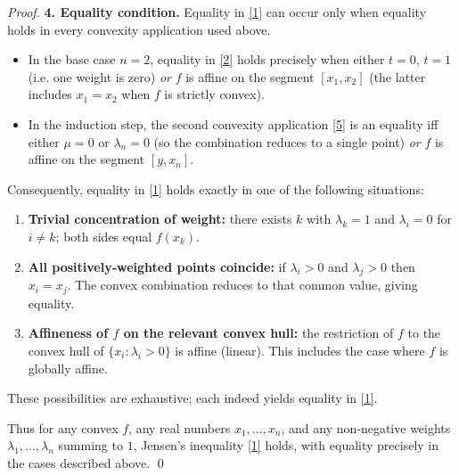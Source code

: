\begin{proof}
\medskip
\textbf{4. Equality condition.}
Equality in \eqref{1} can occur only when equality holds in every convexity
application used above.

\begin{itemize}
\item In the base case $n=2$, equality in \eqref{2} holds precisely when either
  $t=0$, $t=1$ (i.e. one weight is zero) \emph{or} $f$ is affine on the segment
  $[x_{1},x_{2}]$ (the latter includes $x_{1}=x_{2}$ when $f$ is strictly convex).

\item In the induction step, the second convexity application \eqref{5} is an
  equality iff either $\mu=0$ or $\lambda_{n}=0$ (so the combination reduces to a
  single point) \emph{or} $f$ is affine on the segment $[y,x_{n}]$.
\end{itemize}
Consequently, equality in \eqref{1} holds exactly in one of the following
situations:

\begin{enumerate}
\item \textbf{Trivial concentration of weight:} there exists $k$ with
  $\lambda_{k}=1$ and $\lambda_{i}=0$ for $i\neq k$; both sides equal $f(x_{k})$.

\item \textbf{All positively‑weighted points coincide:} if $\lambda_{i}>0$ and
  $\lambda_{j}>0$ then $x_{i}=x_{j}$.  The convex combination reduces to that common
  value, giving equality.

\item \textbf{Affineness of $f$ on the relevant convex hull:} the restriction of
  $f$ to the convex hull of $\{x_{i}:\lambda_{i}>0\}$ is affine (linear).  This
  includes the case where $f$ is globally affine.
\end{enumerate}
These possibilities are exhaustive; each indeed yields equality in \eqref{1}.

\medskip
Thus for any convex $f$, any real numbers $x_{1},\dots ,x_{n}$, and any
non‑negative weights $\lambda_{1},\dots ,\lambda_{n}$ summing to $1$, Jensen’s
inequality \eqref{1} holds, with equality precisely in the cases described
above. \qed
\end{proof}